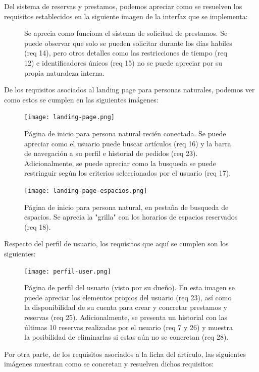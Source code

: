 Del sistema de reservas y prestamos, podemos apreciar como se resuelven los requisitos establecidos en la siguiente imagen de la interfaz que se implementa: \\

\begin{figure}[H]
\caption{Se aprecia como funciona el sistema de solicitud de prestamos. Se puede observar que solo se pueden solicitar durante los días habiles (req 14), pero otros detalles como las restricciones de tiempo (req 12) e identificadores únicos (req 15) no se puede apreciar por su propia naturaleza interna.} 
\label{Solicitar}
\end{figure}

De los requisitos asociados al landing page para personas naturales, podemos ver como estos se cumplen en las siguientes imágenes:


\begin{figure}[H]
\texttt{[image: landing-page.png]}
\caption{Página de inicio para persona natural recién conectada. Se puede apreciar como el usuario puede buscar artículos (req 16) y la barra de navegación a su perfil e historial de pedidos (req 23). Adicionalmente, se puede apreciar como la busqueda se puede restringuir según los criterios seleccionados por el usuario (req 17).} 
\label{LPUsers}
\end{figure}

\begin{figure}[H]
\texttt{[image: landing-page-espacios.png]}
\caption{Página de inicio para persona natural, en pestaña de busqueda de espacios. Se aprecia la "grilla" con los horarios de espacios reservados (req 18).} 
\label{LPUsersEspacios}
\end{figure}

Respecto del perfil de usuario, los requisitos que aquí se cumplen son los siguientes:


\begin{figure}[H]
\texttt{[image: perfil-user.png]}
\caption{Página de perfil del usuario (visto por su dueño). En esta imagen se puede apreciar los elementos propios del usuario (req 23), así como la disponibilidad de su cuenta para crear y concretar prestamos y reservas (req 25). Adicionalmente, se presenta un historial con las últimas 10 reservas realizadas por el usuario (req 7 y 26) y muestra la posibilidad de eliminarlas si estas aún no se concretan (req 28).} 
\label{LPUsersEspacios}
\end{figure}

Por otra parte, de los requisitos asociados a la ficha del artículo, las siguientes imágenes muestran como se concretan y resuelven dichos requisitos:

